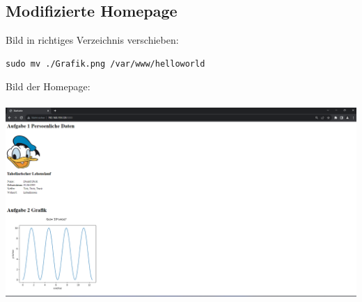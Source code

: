 \documentclass[a4paper,11pt,titlepage]{article}
\begin{document}
\subsection{Modifizierte Homepage}
Bild in richtiges Verzeichnis verschieben: 
\begin{verbatim}sudo mv ./Grafik.png /var/www/helloworld \end{verbatim}
Bild der Homepage:\\
\\
\includegraphics [width = 15 cm] {Website-Aufgabe2.png}
\end{document}
